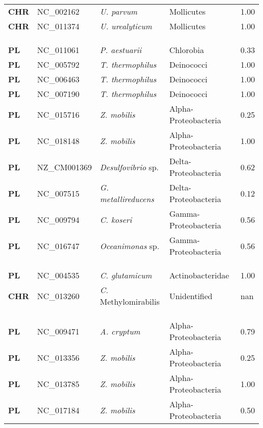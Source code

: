 \begin{adjustwidth}{-3cm}{2cm}
{\begin{supertabular}{>{\bfseries}l|p{0.1\textwidth}p{0.14\textwidth}l|l}
CHR & NC\_002162 & \textit{U. parvum} & Mollicutes & 1.00\\
CHR & NC\_011374 & \textit{U. urealyticum} & Mollicutes & 1.00\\
\\
\\
\hline\\
PL & NC\_011061 & \textit{P. aestuarii} & Chlorobia & 0.33\\
PL & NC\_005792 & \textit{T. thermophilus} & Deinococci & 1.00\\
PL & NC\_006463 & \textit{T. thermophilus} & Deinococci & 1.00\\
PL & NC\_007190 & \textit{T. thermophilus} & Deinococci & 1.00\\
PL & NC\_015716 & \textit{Z. mobilis} & Alpha-Proteobacteria & 0.25\\
PL & NC\_018148 & \textit{Z. mobilis} & Alpha-Proteobacteria & 1.00\\
PL & NZ\_CM001369 & \textit{Desulfovibrio} sp. & Delta-Proteobacteria & 0.62\\
PL & NC\_007515 & \textit{G. metallireducens} & Delta-Proteobacteria & 0.12\\
PL & NC\_009794 & \textit{C. koseri} & Gamma-Proteobacteria & 0.56\\
PL & NC\_016747 & \textit{Oceanimonas} sp. & Gamma-Proteobacteria & 0.56\\
\\
\\
\hline\\
PL & NC\_004535 & \textit{C. glutamicum} & Actinobacteridae & 1.00\\
CHR & NC\_013260 & \textit{C.} Methylomirabilis & Unidentified & nan\\
\\
\\
\hline\\
PL & NC\_009471 & \textit{A. cryptum} & Alpha-Proteobacteria & 0.79\\
PL & NC\_013356 & \textit{Z. mobilis} & Alpha-Proteobacteria & 0.25\\
PL & NC\_013785 & \textit{Z. mobilis} & Alpha-Proteobacteria & 1.00\\
PL & NC\_017184 & \textit{Z. mobilis} & Alpha-Proteobacteria & 0.50\\

\end{supertabular}}
\end{adjustwidth}

